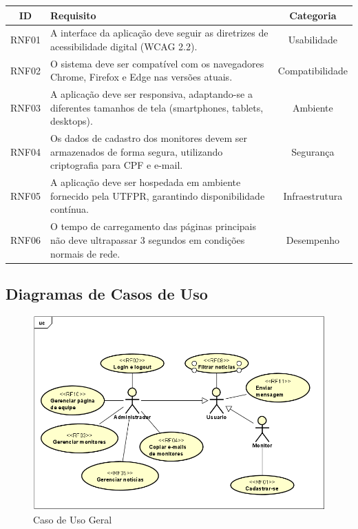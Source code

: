 \documentclass[a4paper,12pt]{article}
\begin{document}
\begin{longtable}{|c|p{10cm}|c|}
    \hline
    \textbf{ID} & \textbf{Requisito} & \textbf{Categoria} \\
    \hline
    RNF01 & A interface da aplicação deve seguir as diretrizes de acessibilidade digital (WCAG 2.2). & Usabilidade \\
    \hline
    RNF02 & O sistema deve ser compatível com os navegadores Chrome, Firefox e Edge nas versões atuais. & Compatibilidade \\
    \hline
    RNF03 & A aplicação deve ser responsiva, adaptando-se a diferentes tamanhos de tela (smartphones, tablets, desktops). & Ambiente \\
    \hline
    RNF04 & Os dados de cadastro dos monitores devem ser armazenados de forma segura, utilizando criptografia para CPF e e-mail. & Segurança \\
    \hline
    RNF05 & A aplicação deve ser hospedada em ambiente fornecido pela UTFPR, garantindo disponibilidade contínua. & Infraestrutura \\
    \hline
    RNF06 & O tempo de carregamento das páginas principais não deve ultrapassar 3 segundos em condições normais de rede. & Desempenho \\
    \hline
\end{longtable}

\clearpage

\subsection{Diagramas de Casos de Uso}

\begin{figure} [h]
    \centering
    \includegraphics[width=1\linewidth]{caso_de_usoGeral.png}
    \caption{Caso de Uso Geral}
    \label{fig:enter-label}
\end{figure}
\end{document}
